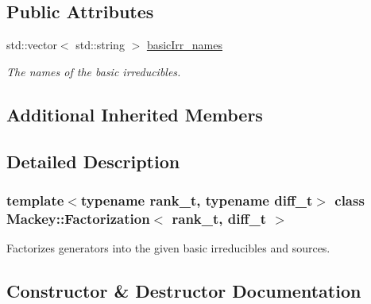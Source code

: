 \subsection*{Public Attributes}
\begin{DoxyCompactItemize}
\item 
std\+::vector$<$ std\+::string $>$ \hyperlink{classMackey_1_1Factorization_aafee5aadae0d83b75741e0e8c2955625}{basic\+Irr\+\_\+names}
\begin{DoxyCompactList}\small\item\em The names of the basic irreducibles. \end{DoxyCompactList}\end{DoxyCompactItemize}
\subsection*{Additional Inherited Members}


\subsection{Detailed Description}
\subsubsection*{template$<$typename rank\+\_\+t, typename diff\+\_\+t$>$\newline
class Mackey\+::\+Factorization$<$ rank\+\_\+t, diff\+\_\+t $>$}

Factorizes generators into the given basic irreducibles and sources. 

\subsection{Constructor \& Destructor Documentation}
\mbox{\label{classMackey_1_1Factorization_af1b07ab5021c4e51698c4cd3fbb85422}} 
